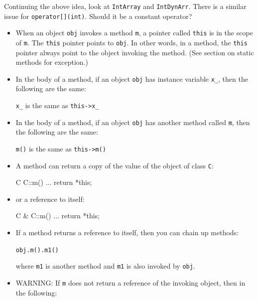 \begin{ex}
Continuing the above idea, look at \texttt{IntArray}
and \texttt{IntDynArr}. There is a similar issue for
\texttt{operator[](int)}. Should it be a constant operator?
\end{ex}


\newpage{}

\begin{itemize}
\item When an object \texttt{obj} invokes a method \texttt{m}, a pointer called
  \texttt{this} is in the scope of \texttt{m}. The \texttt{this} pointer
  points to \texttt{obj}. In other words, in a method, the \texttt{this}
  pointer always point to the object invoking the method. (See section
  on static methods for exception.)

\item In the body of a method, if an object \texttt{obj} has instance variable
  \texttt{x\_}, then the following are the same:

\texttt{x\_} is the same as \texttt{this->x\_}

\item In the body of a method, if an object \texttt{obj} has another method
  called \texttt{m}, then the following are the same:

\texttt{m()} is the same as \texttt{this->m()}

\item A method can return a copy of the value of the object of class
  \texttt{C}:

\begin{consolethree}[escapeinside=||]
C C::m()
{
    ...
    return *this;
}
\end{consolethree}

\item or a reference to itself:

\begin{consolethree}[escapeinside=||]
C & C::m()
{
    ...
    return *this;
}
\end{consolethree}

\item If a method returns a reference to itself, then you can chain up
  methods:

\texttt{obj.m().m1()}

  where \texttt{m1} is another method and \texttt{m1} is also invoked by
  \texttt{obj}.

\item WARNING: If \texttt{m} does not return a reference of the invoking
  object, then in the following:


\end{itemize}
